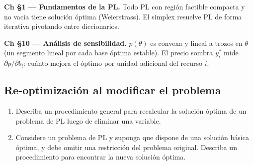 \documentclass[12pt]{article}
\theoremstyle{plain}
\begin{document}
\begin{teofund}
\textbf{Ch §1 — Fundamentos de la PL.} Todo PL con región factible compacta y no vacía tiene solución óptima (Weierstrass). El simplex resuelve PL de forma iterativa pivotando entre diccionarios.

\textbf{Ch §10 — Análisis de sensibilidad.} $p(\theta)$ es convexa y lineal a trozos en $\theta$ (un segmento lineal por cada base óptima estable). El precio sombra $y_i^*$ mide $\partial p/\partial b_i$: cuánto mejora el óptimo por unidad adicional del recurso $i$.
\end{teofund}

\bigskip

\subsection{Re-optimización al modificar el problema}

\begin{enumerate}[label=\alph*)]
      \item Describa un procedimiento general para recalcular la solución óptima de un
            problema de PL luego de eliminar una variable.

      \item Considere un problema de PL y suponga que dispone de una solución básica
            óptima, y debe omitir una restricción del problema original. Describa un
            procedimiento para encontrar la nueva solución óptima.
\end{enumerate}
\end{document}
